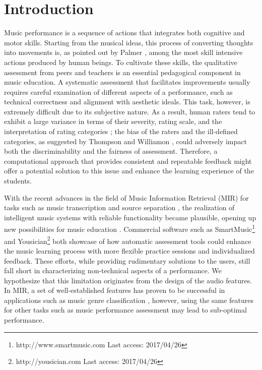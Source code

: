 \documentclass[conference]{IEEEtran}
\begin{document}

%
\IEEEpeerreviewmaketitle



\section{Introduction}
Music performance is a sequence of actions that integrates both cognitive and motor skills. Starting from the musical ideas, this process of converting thoughts into movements is, as pointed out by Palmer \cite{Palmer1997}, among the most skill intensive actions produced by human beings. To cultivate these skills, the qualitative assessment from  peers and teachers is an essential pedagogical component in music education. A systematic assessment that facilitates improvements usually requires careful examination of different aspects of a performance, such as technical correctness and alignment with aesthetic ideals. This task, however, is extremely difficult due to its subjective nature. As a result, human raters tend to exhibit a large variance in terms of their severity, rating scale, and the interpretation of rating categories \cite{Wesolowski2016}; the bias of the raters and the ill-defined categories, as suggested by Thompson and Williamon \cite{Thompson2003}, could adversely impact both the discriminability and the fairness of assessment. Therefore, a computational approach that provides consistent and repeatable feedback might offer a potential solution to this issue and enhance the learning experience of the students. 

With the recent advances in the field of Music Information Retrieval (MIR) for tasks such as music transcription \cite{Benetos2013} and source separation \cite{Huang2014}, the realization of intelligent music systems with reliable functionality became plausible, opening up new possibilities for music education \cite{Dittmar2012}. Commercial software such as SmartMusic\footnote{http://www.smartmusic.com Last access: 2017/04/26} and Yousician\footnote{http://yousician.com Last access: 2017/04/26} both showcase of how automatic assessment tools could enhance the music learning process with more flexible practice sessions and individualized feedback. These efforts, while providing rudimentary solutions to the users, still fall short in characterizing non-technical aspects of a performance. We hypothesize that this limitation originates from the design of the audio features. In MIR, a set of well-established features has proven to be successful in applications such as music genre classification \cite{Tzanetakis2002}, however, using the same features for other tasks such as music performance assessment may lead to sub-optimal performance. %
\end{document}
